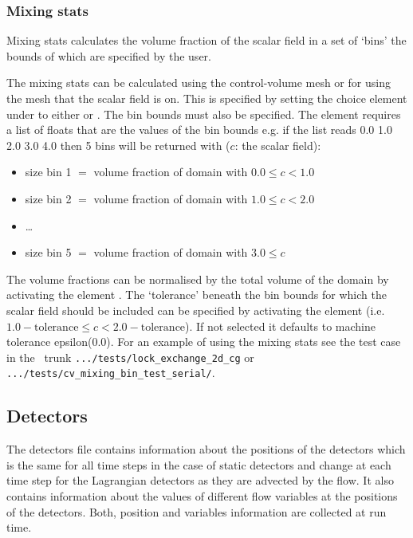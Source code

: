 \subsubsection{Mixing stats}
\label{sec:stat_mixing_stats}
Mixing stats calculates the volume fraction of the scalar field in a set of `bins' the bounds of which are specified by the user.

The mixing stats can be calculated using the control-volume mesh or for \Poo using the mesh that the scalar field is on. This is specified by setting the choice element under  to either  or . The bin bounds must also be specified.  The element  requires a list of floats that are the values of the bin bounds e.g. if the list reads 0.0 1.0 2.0 3.0 4.0 then 5 bins will be returned with ($c$: the scalar field):
\begin{itemize}
\item size bin 1 $=$ volume fraction of domain with $0.0\leq c < 1.0$
\item size bin 2 $=$ volume fraction of domain with $1.0\leq c < 2.0$
\item \ldots
\item size bin 5 $=$ volume fraction of domain with $3.0\leq c$
\end{itemize}

The volume fractions can be normalised by the total volume of the domain by activating the element . The `tolerance' beneath the bin bounds for which the scalar field should be included can be specified by activating the element  (i.e. $1.0-\mathrm{tolerance} \leq c < 2.0-\mathrm{tolerance}$). If not selected it defaults to machine tolerance epsilon(0.0). For an example of using the mixing stats see the test case in the \fluidity\ trunk \lstinline[language = bash]+.../tests/lock_exchange_2d_cg+ or \lstinline[language = bash]+.../tests/cv_mixing_bin_test_serial/+.

\subsection{Detectors}
\label{sec:diagnostics_detectors}
The detectors file contains information about the positions of the detectors which is the same for all time steps in the case of static detectors and change at each time step for the Lagrangian detectors as they are advected by the flow. It also contains information about the values of different flow variables at the positions of the detectors. Both, position and variables information are collected at run time.


